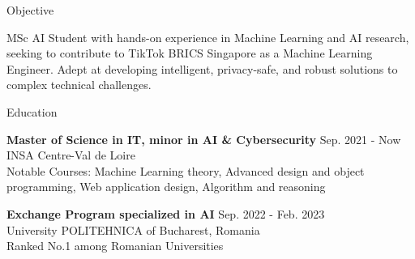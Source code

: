 \documentclass{resume} %
\begin{document}

\begin{rSection}{Objective}

{MSc AI Student with hands-on experience in Machine Learning and AI research, seeking to contribute to TikTok BRICS Singapore as a Machine Learning Engineer. Adept at developing intelligent, privacy-safe, and robust solutions to complex technical challenges.}

\end{rSection}


\begin{rSection}{Education}

{\bf Master of Science in IT, minor in AI \& Cybersecurity} \hfill {Sep. 2021 - Now} \\
INSA Centre-Val de Loire \\
Notable Courses: Machine Learning theory, Advanced design and object programming, Web application design, Algorithm and reasoning

{\bf Exchange Program specialized in AI} \hfill {Sep. 2022 - Feb. 2023} \\
University POLITEHNICA of Bucharest, Romania \\
Ranked No.1 among Romanian Universities

\end{rSection}

\end{document}
